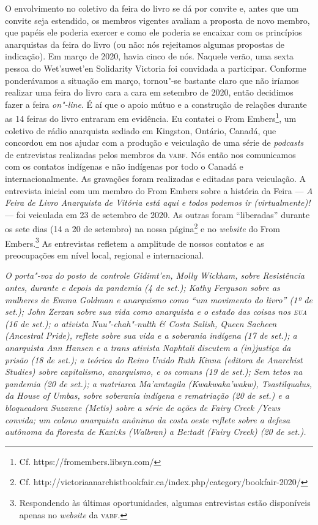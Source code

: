 O envolvimento no coletivo da feira do livro se dá por convite e, antes
que um convite seja estendido, os membros vigentes avaliam a proposta de
novo membro, que papéis ele poderia exercer e como ele poderia se
encaixar com os princípios anarquistas da feira do livro (ou não: nós
rejeitamos algumas propostas de indicação). Em março de 2020, havia
cinco de nós. Naquele verão, uma sexta pessoa do Wet'suwet'en Solidarity
Victoria foi convidada a participar. Conforme ponderávamos a situação em
março, tornou"-se bastante claro que não iríamos realizar uma feira do
livro cara a cara em setembro de 2020, então decidimos fazer a feira
\emph{on"-line}. É aí que o apoio mútuo e a construção de relações
durante as 14 feiras do livro entraram em evidência. Eu contatei o From
Embers\footnote{Cf. https://fromembers.libsyn.com/}, um coletivo de
rádio anarquista sediado em Kingston, Ontário, Canadá, que concordou em
nos ajudar com a produção e veiculação de uma série de \emph{podcasts}
de entrevistas realizadas pelos membros da \textsc{vabf}. Nós então nos
comunicamos com os contatos indígenas e não indígenas por todo o Canadá
e internacionalmente. As gravações foram realizadas e editadas para
veiculação. A entrevista inicial com um membro do From Embers sobre a
história da Feira --- \emph{A Feira de Livro Anarquista de Vitória está
aqui e todos podemos ir (virtualmente)!} --- foi veiculada em 23 de
setembro de 2020. As outras foram ``liberadas'' durante os sete dias (14
a 20 de setembro) na nossa página\footnote{Cf.
  http://victoriaanarchistbookfair.ca/index.php/category/bookfair-2020/}
e no \emph{website} do From Embers.\footnote{Respondendo às últimas
  oportunidades, algumas entrevistas estão disponíveis apenas no
  \emph{website} da \textsc{vabf}.} As entrevistas refletem a amplitude de nossos
contatos e as preocupações em nível local, regional e internacional.

\emph{O porta"-voz do posto de controle Gidimt'en, Molly Wickham, sobre
Resistência antes, durante e depois da pandemia (4 de set.); Kathy
Ferguson sobre as mulheres de Emma Goldman e anarquismo como ``um
movimento do livro'' (1º de set.); John Zerzan sobre sua vida como
anarquista e o estado das coisas nos \textsc{eua} (16 de set.); o ativista
Nuu"-chah"-nulth \& Costa Salish, Queen Sacheen (Ancestral Pride), reflete
sobre sua vida e a soberania indígena (17 de set.); a anarquista Ann
Hansen e a trans ativista Naphtali discutem a (in)justiça da prisão (18
de set.); a teórica do Reino Unido Ruth Kinna (editora de Anarchist
Studies) sobre capitalismo, anarquismo, e os comuns (19 de set.); Sem
tetos na pandemia (20 de set.); a matriarca Ma'amtagila (Kwakwaka'wakw),
Tsastilqualus, da House of Umbas, sobre soberania indígena e rematriação
(20 de set.) e a bloqueadora Suzanne (Metis) sobre a série de ações de
Fairy Creek /Yews convida; um colono anarquista anônimo da costa oeste
reflete sobre a defesa autônoma da floresta de Kaxi:ks (Walbran) a
Be:tadt (Fairy Creek) (20 de set.).}

